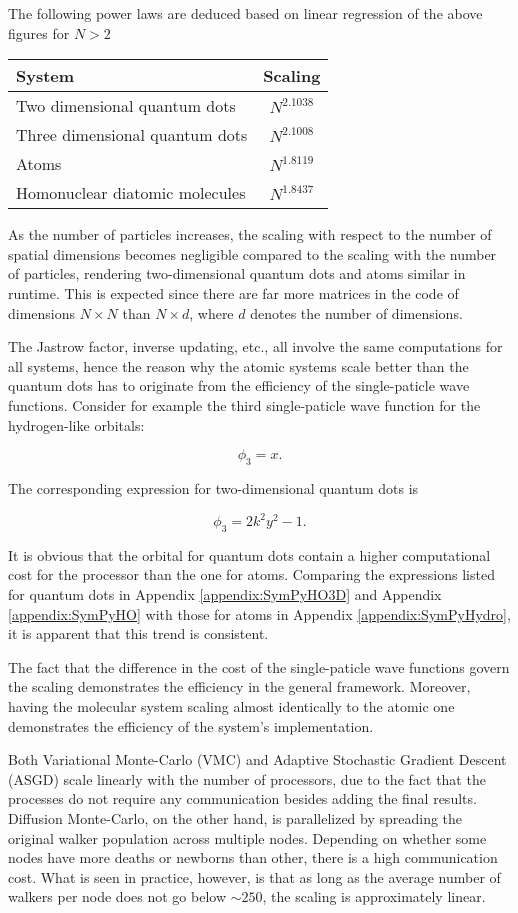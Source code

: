 The following power laws are deduced based on linear regression of the above figures for $N > 2$

\begin{tabular}{l|c}
System & Scaling \\
\hline
Two dimensional quantum dots & $N^{2.1038}$ \\
Three dimensional quantum dots & $N^{2.1008}$ \\
Atoms & $N^{1.8119}$ \\
Homonuclear diatomic molecules & $N^{1.8437}$ \\ 
\end{tabular}


As the number of particles increases, the scaling with respect to the number of spatial dimensions becomes negligible compared to the scaling with the number of particles, rendering two-dimensional quantum dots and atoms similar in runtime. This is expected since there are far more matrices in the code of dimensions $N\times N$ than $N \times d$, where $d$ denotes the number of dimensions. 

The Jastrow factor, inverse updating, etc., all involve the same computations for all systems, hence the reason why the atomic systems scale better than the quantum dots has to originate from the efficiency of the single-paticle wave functions. Consider for example the third single-paticle wave function for the hydrogen-like orbitals:

\begin{equation}
 \phi_3 = x.
\end{equation}

The corresponding expression for two-dimensional quantum dots is

\begin{equation}
  \phi_3 = 2k^2y^2 - 1.
\end{equation}

It is obvious that the orbital for quantum dots contain a higher computational cost for the processor than the one for atoms. Comparing the expressions listed for quantum dots in Appendix \ref{appendix:SymPyHO3D} and Appendix \ref{appendix:SymPyHO} with those for atoms in Appendix \ref{appendix:SymPyHydro}, it is apparent that this trend is consistent.

The fact that the difference in the cost of the single-paticle wave functions govern the scaling demonstrates the efficiency in the general framework. Moreover, having the molecular system scaling almost identically to the atomic one demonstrates the efficiency of the system's implementation. 

Both Variational Monte-Carlo (VMC) and Adaptive Stochastic Gradient Descent (ASGD) scale linearly with the number of processors, due to the fact that the processes do not require any communication besides adding the final results. Diffusion Monte-Carlo, on the other hand, is parallelized by spreading the original walker population across multiple nodes. Depending on whether some nodes have more deaths or newborns than other, there is a high communication cost. What is seen in practice, however, is that as long as the average number of walkers per node does not go below $\sim250$, the scaling is approximately linear. 




